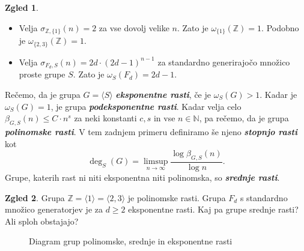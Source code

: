 \documentclass[11pt]{book}
\def\NN{\mathbb{N}}
\def\ZZ{\mathbb{Z}}
\def\definicija{\color{rdeca}\bf\em}
\def\vprasanje{\color{oranzna}}
\theoremstyle{definition}
\theoremstyle{zgled}
\newtheorem*{zgled}{Zgled}
\theoremstyle{odprtproblem}
\theoremstyle{domacanaloga}
\theoremstyle{izrek}
\begin{document}
\begin{zgled}
\begin{itemize}
    \item Velja $\sigma_{\ZZ, \{ 1 \}}(n) = 2$ za vse dovolj velike $n$. Zato je $\omega_{\{ 1 \}}(\ZZ) = 1$. Podobno je $\omega_{\{ 2, 3 \}}(\ZZ) = 1$.
    \item Velja $\sigma_{F_d, S}(n) = 2d \cdot (2d - 1)^{n-1}$ za standardno generirajočo množico proste grupe $S$. Zato je $\omega_S(F_d) = 2d-1$.
\end{itemize}
\end{zgled}

Rečemo, da je grupa $G = \langle S \rangle$ {\definicija eksponentne rasti}, če je $\omega_S(G) > 1$. Kadar je $\omega_S(G) = 1$, je grupa {\definicija podeksponentne rasti}. Kadar velja celo $\beta_{G,S}(n) \leq C \cdot n^s$ za neki konstanti $c,s$ in vse $n \in \NN$, pa rečemo, da je grupa {\definicija polinomske rasti}. V tem zadnjem primeru definiramo še njeno {\definicija stopnjo rasti} kot
\[
\deg_S(G) = \limsup_{n \to \infty} \frac{\log \beta_{G,S}(n)}{\log n}.
\]
Grupe, katerih rast ni niti eksponentna niti polinomska, so {\definicija srednje rasti}.

\begin{zgled}
Grupa $\ZZ = \langle 1 \rangle = \langle 2,3 \rangle$ je polinomske rasti. Grupa $F_d$ s standardno množico generatorjev je za $d \geq 2$ eksponentne rasti. {\vprasanje Kaj pa grupe srednje rasti? Ali sploh obstajajo?}
\end{zgled}

\begin{figure}[t]
\centering
{}
\caption{Diagram grup polinomske, srednje in eksponentne rasti}
\end{figure}
\end{document}
